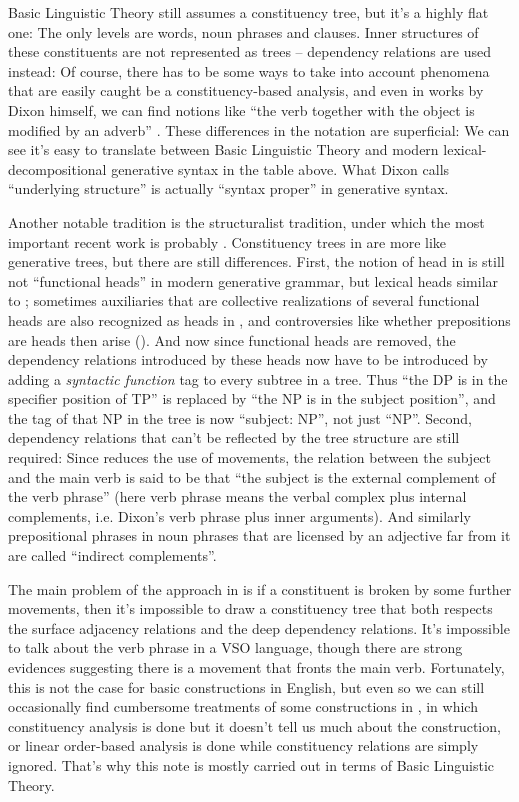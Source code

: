 \documentclass[UTF8, a4paper, oneside, scheme=plain]{ctexrep}
\newcommand*{\citepage}[1]{pp.~{#1}}
\begin{document}
Basic Linguistic Theory still assumes a constituency tree,
but it's a highly flat one:
The only levels are words, noun phrases and clauses.
Inner structures of these constituents are not represented as trees -- 
dependency relations are used instead:
Of course, there has to be some ways 
to take into account phenomena that are easily caught be a constituency-based analysis,
and even in works by Dixon himself,
we can find notions like ``the verb together with the object is modified by an adverb''
\citep[\citepage{376}]{dixon2005semantic}.
These differences in the notation are superficial:
We can see it's easy to translate between Basic Linguistic Theory 
and modern lexical-decompositional generative syntax
in the table above.
What Dixon calls ``underlying structure'' is actually ``syntax proper'' in generative syntax.

Another notable tradition is the structuralist tradition,
under which the most important recent work is probably \citet{cgel}.
Constituency trees in \citet{cgel} are more like generative trees,
but there are still differences.
First, the notion of head in \citet{cgel} is still not ``functional heads'' 
in modern generative grammar, but lexical heads similar to \citet{dixon2009basic1};
sometimes auxiliaries that are collective realizations of several functional heads 
are also recognized as heads in \citet{cgel}, 
and controversies like whether prepositions are heads then arise
().
And now since functional heads are removed,
the dependency relations introduced by these heads
now have to be introduced by adding a \emph{syntactic function} tag 
to every subtree in a tree.
Thus ``the DP is in the specifier position of TP''
is replaced by ``the NP is in the subject position'',
and the tag of that NP in the tree is now ``subject: NP'',
not just ``NP''.
Second, dependency relations that can't be reflected by the tree structure are still required:
Since \citet{cgel} reduces the use of movements,
the relation between the subject and the main verb 
is said to be that ``the subject is the external complement of the verb phrase''
(here verb phrase means the verbal complex plus internal complements,
i.e. Dixon's verb phrase plus inner arguments).
And similarly prepositional phrases in noun phrases that are licensed by an adjective far from it 
are called ``indirect complements''.

The main problem of the approach in \citet{cgel} is 
if a constituent is broken by some further movements,
then it's impossible to draw a constituency tree that 
both respects the surface adjacency relations 
and the deep dependency relations.
It's impossible to talk about the verb phrase in a VSO language,
though there are strong evidences suggesting there is a movement that fronts the main verb.
Fortunately, this is not the case for basic constructions in English,
but even so we can still occasionally find cumbersome treatments of some constructions in \citet{cgel},
in which constituency analysis is done but it doesn't tell us much about the construction,
or linear order-based analysis is done while constituency relations are simply ignored.
That's why this note is mostly carried out in terms of Basic Linguistic Theory.
\end{document}
